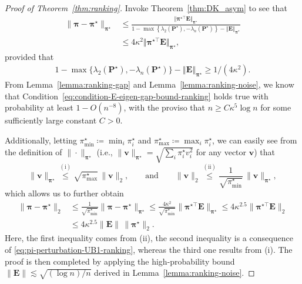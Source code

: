 \begin{proof}[Proof of Theorem~\ref{thm:ranking}]
Invoke Theorem~\ref{thm:DK_asym} to see that
%
\begin{align}
	\|\bm{\pi}-\bm{\pi}^{\star}\|_{\bm{\pi}^{\star}}
	& \leq \frac{\big\Vert \bm{\pi}^{\star\top}\bm{E}\big\Vert _{\bm{\pi}^{\star}}}
	{1-\max\left\{ \lambda_{2}(\bm{P}^{\star}),-\lambda_{n}(\bm{P}^{\star})\right\} -\left\Vert \bm{E}\right\Vert _{\bm{\pi}^{\star}}} \nonumber\\
	& \leq 4 \kappa^{2}\big\Vert \bm{\pi}^{\star\top}\bm{E}\big\Vert _{\bm{\pi}^{\star}},
	\label{eq:pi-perturbation-UB1-ranking}
\end{align}
%
provided that
%
\begin{align}
	1-\max\big\{ \lambda_{2}(\bm{P}^{\star}),-\lambda_{n}(\bm{P}^{\star})\big\}
	-\left\Vert \bm{E}\right\Vert _{\bm{\pi}^{\star}}\geq1/(4\kappa^{2}) .
	\label{eq:condition-E-eigen-gap-bound-ranking}
\end{align}
%
From Lemma~\ref{lemma:ranking-gap} and Lemma~\ref{lemma:ranking-noise},
we know that Condition~\eqref{eq:condition-E-eigen-gap-bound-ranking} holds true with probability at least $1-O(n^{-8})$,
with the proviso that $n\geq C\kappa^{5}\log n$ for some sufficiently large constant $C>0$.


Additionally, letting $\pi_{\min}^{\star} \coloneqq \min_i\pi_i^{\star} $ and $\pi_{\max}^{\star} \coloneqq \max_i\pi_i^{\star} $,
we can easily see from the definition of $\|\cdot\|_{\bm{\pi}^{\star}}$ (i.e., $\|\bm{v}\|_{\bm{\pi}^{\star}}=\sqrt{\sum_i \pi_i^{\star}v_i^2 }$ for any vector $\bm{v}$)  that
%
\[
	\|\bm{v}\|_{\bm{\pi}^{\star}} \overset{\mathrm{(i)}}{\leq} \sqrt{\pi^{\star}_{\max }} \, \|\bm{v}\|_2 , \qquad \text{and} \qquad
	\|\bm{v}\|_2  \overset{\mathrm{(ii)}}{\leq}  \frac{1}{\sqrt{  \pi^{\star}_{\min} } } \, \|\bm{v}\|_{\bm{\pi}^{\star}} ,
\]
%
which allows us to further obtain
%
\begin{align*}
\|\bm{\pi}-\bm{\pi}^{\star}\|_{2} & \leq\frac{1}{\sqrt{\pi_{\min}^{\star}}}\|\bm{\pi}-\bm{\pi}^{\star}\|_{\bm{\pi}^{\star}}\leq\frac{4\kappa^{2}}{\sqrt{\pi_{\min}^{\star}}}\|\bm{\pi}^{\star\top}\bm{E}\|_{\bm{\pi}^{\star}}\leq4\kappa^{2.5}\|\bm{\pi}^{\star\top}\bm{E}\|_{2}\\
 & \leq4\kappa^{2.5}\|\bm{E}\|\,\|\bm{\pi}^{\star}\|_{2}.
\end{align*}
%
Here, the first inequality comes from (ii), the second inequality is a consequence of \eqref{eq:pi-perturbation-UB1-ranking}, whereas the third one results from (i).
The proof is then completed by applying the high-probability bound $\|\bm{E}\|\lesssim\sqrt{(\log n)/n}$ derived in Lemma~\ref{lemma:ranking-noise}.
\end{proof}





